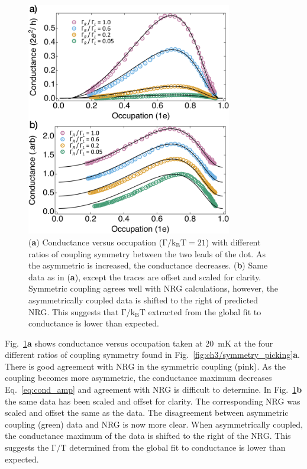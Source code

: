 \begin{figure}[!bht]
 \begin{center}
 \includegraphics[width=0.8\textwidth]{figures/ch3/crop_FiguresMaster.019.png}
 \caption[Conductance vs. Occupation : Varying the coupling symmetry]{\label{fig:ch3/cond_occ_assymetry} 
 (\textbf{a}) Conductance versus occupation ($\mathrm{\Gamma/k_BT=21}$) with different ratios of coupling symmetry between the two leads of the dot. As the asymmetric is increased, the conductance decreases.
 (\textbf{b}) Same data as in (\textbf{a}), except the traces are offset and scaled for clarity. Symmetric coupling agrees well with NRG calculations, however, the asymmetrically coupled data is shifted to the right of predicted NRG. This suggests that $\mathrm{\Gamma/k_BT}$ extracted from the global fit to conductance is lower than expected.}
 \end{center}
\end{figure}


Fig.~\ref{fig:ch3/cond_occ_assymetry}\textbf{a} shows conductance versus occupation taken at \qty{20}{mK} at the four different ratios of coupling symmetry found in Fig.~\ref{fig:ch3/symmetry_picking}\textbf{a}. There is good agreement with NRG in the symmetric coupling (pink). As the coupling becomes more asymmetric, the conductance maximum decreases Eq.~\ref{eq:cond_amp} and agreement with NRG is difficult to determine. In Fig.~\ref{fig:ch3/cond_occ_assymetry}\textbf{b} the same data has been scaled and offset for clarity. The corresponding NRG was scaled and offset the same as the data. The disagreement between asymmetric coupling (green) data and NRG is now more clear. When asymmetrically coupled, the conductance maximum of the data is shifted to the right of the NRG. This suggests the $\mathrm{\Gamma/T}$ determined from the global fit to conductance is lower than expected. 

